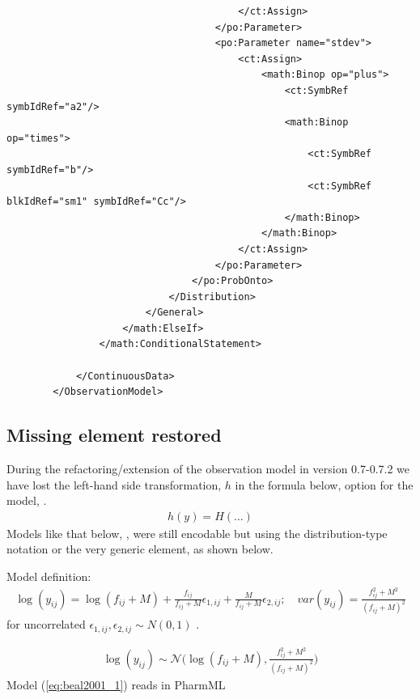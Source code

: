 \begin{lstlisting}
                                        </ct:Assign>
                                    </po:Parameter>
                                    <po:Parameter name="stdev">
                                        <ct:Assign>
                                            <math:Binop op="plus">
                                                <ct:SymbRef symbIdRef="a2"/>
                                                <math:Binop op="times">
                                                    <ct:SymbRef symbIdRef="b"/>
                                                    <ct:SymbRef blkIdRef="sm1" symbIdRef="Cc"/>
                                                </math:Binop>
                                            </math:Binop>
                                        </ct:Assign>
                                    </po:Parameter>
                                </po:ProbOnto>
                            </Distribution>
                        </General>
                    </math:ElseIf>
                </math:ConditionalStatement>
                
            </ContinuousData>
        </ObservationModel>
\end{lstlisting}


\subsection{Missing element restored}
During the refactoring/extension of the observation model in version 0.7-0.7.2
we have lost the left-hand side transformation, $h$ in the formula below, 
option for the  model, \cite{Pharmml_06}.
\begin{align}
 h(y) = H(...) \nonumber
\end{align}
Models like that below, \cite{Beal:2001}, were still encodable but using the distribution-type
notation or the very generic  element, as shown below.

\bigskip
Model definition:
\begin{eqnarray}
\log(y_{ij}) =  \log(f_{ij}+M) + \frac{f_{ij}}{f_{ij}+M} \epsilon_{1,ij} + \frac{M}{f_{ij}+M} \epsilon_{2,ij}; \quad \mathit{var}(y_{ij}) = \frac{f_{ij}^2 + M^2}{(f_{ij}+M)^2} \label{eq:beal2001_1}
\end{eqnarray}
for uncorrelated $\epsilon_{1,ij}, \epsilon_{2,ij}\sim N(0,1)$ .
\bigskip

\begin{eqnarray}
 \log(y_{ij}) \sim \mathcal{N}\Big( \log(f_{ij}+M), \frac{f_{ij}^2 + M^2}{(f_{ij}+M)^2} \Big) \label{eq:beal2001_2}
\end{eqnarray}
Model (\ref{eq:beal2001_1}) reads in PharmML

